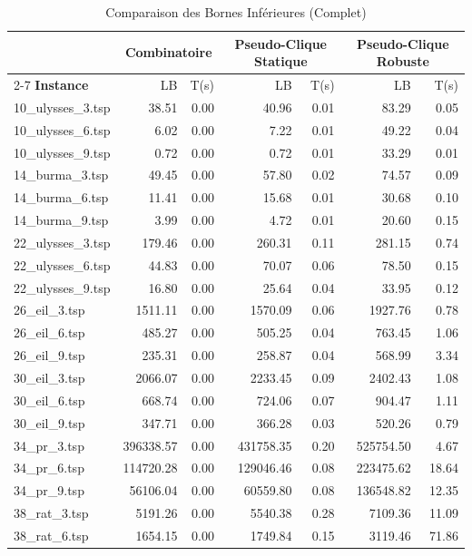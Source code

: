 \begin{table}[H]
\centering
\caption{Comparaison des Bornes Inférieures (Complet)}
\small
\begin{tabular}{|l||r|r||r|r||r|r|}
\hline
 & \multicolumn{2}{c||}{\textbf{Combinatoire}} & \multicolumn{2}{c||}{\textbf{Pseudo-Clique Statique}} & \multicolumn{2}{c|}{\textbf{Pseudo-Clique Robuste}} \\
\cline{2-7}
\textbf{Instance} & LB & T(s) & LB & T(s) & LB & T(s) \\
\hline
10\_ulysses\_3.tsp & 38.51 & 0.00 & 40.96 & 0.01 & 83.29 & 0.05 \\
10\_ulysses\_6.tsp & 6.02 & 0.00 & 7.22 & 0.01 & 49.22 & 0.04 \\
10\_ulysses\_9.tsp & 0.72 & 0.00 & 0.72 & 0.01 & 33.29 & 0.01 \\
14\_burma\_3.tsp & 49.45 & 0.00 & 57.80 & 0.02 & 74.57 & 0.09 \\
14\_burma\_6.tsp & 11.41 & 0.00 & 15.68 & 0.01 & 30.68 & 0.10 \\
14\_burma\_9.tsp & 3.99 & 0.00 & 4.72 & 0.01 & 20.60 & 0.15 \\
22\_ulysses\_3.tsp & 179.46 & 0.00 & 260.31 & 0.11 & 281.15 & 0.74 \\
22\_ulysses\_6.tsp & 44.83 & 0.00 & 70.07 & 0.06 & 78.50 & 0.15 \\
22\_ulysses\_9.tsp & 16.80 & 0.00 & 25.64 & 0.04 & 33.95 & 0.12 \\
26\_eil\_3.tsp & 1511.11 & 0.00 & 1570.09 & 0.06 & 1927.76 & 0.78 \\
26\_eil\_6.tsp & 485.27 & 0.00 & 505.25 & 0.04 & 763.45 & 1.06 \\
26\_eil\_9.tsp & 235.31 & 0.00 & 258.87 & 0.04 & 568.99 & 3.34 \\
30\_eil\_3.tsp & 2066.07 & 0.00 & 2233.45 & 0.09 & 2402.43 & 1.08 \\
30\_eil\_6.tsp & 668.74 & 0.00 & 724.06 & 0.07 & 904.47 & 1.11 \\
30\_eil\_9.tsp & 347.71 & 0.00 & 366.28 & 0.03 & 520.26 & 0.79 \\
34\_pr\_3.tsp & 396338.57 & 0.00 & 431758.35 & 0.20 & 525754.50 & 4.67 \\
34\_pr\_6.tsp & 114720.28 & 0.00 & 129046.46 & 0.08 & 223475.62 & 18.64 \\
34\_pr\_9.tsp & 56106.04 & 0.00 & 60559.80 & 0.08 & 136548.82 & 12.35 \\
38\_rat\_3.tsp & 5191.26 & 0.00 & 5540.38 & 0.28 & 7109.36 & 11.09 \\
38\_rat\_6.tsp & 1654.15 & 0.00 & 1749.84 & 0.15 & 3119.46 & 71.86 \\

\end{tabular}
\end{table}
